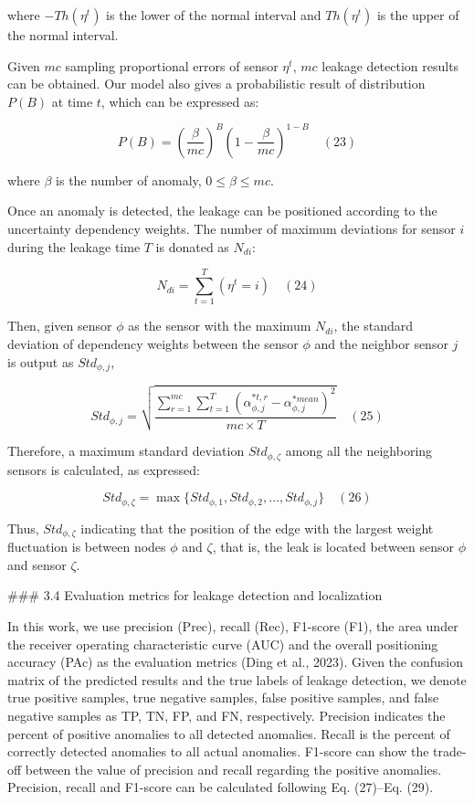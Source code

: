 where $-Th(\eta^t)$ is the lower of the normal interval and $Th(\eta^t)$ is the upper of the normal interval.

Given $mc$ sampling proportional errors of sensor $\eta^t$, $mc$ leakage detection results can be obtained. Our model also gives a probabilistic result of distribution $P(B)$ at time $t$, which can be expressed as:

$$
P(B) = \left(\frac{\beta}{mc}\right)^B \left(1 - \frac{\beta}{mc}\right)^{1-B} \quad (23)
$$

where $\beta$ is the number of anomaly, $0 \leq \beta \leq mc$.

Once an anomaly is detected, the leakage can be positioned according to the uncertainty dependency weights. The number of maximum deviations for sensor $i$ during the leakage time $T$ is donated as $N_{di}$:

$$
N_{di} = \sum_{t=1}^T (\eta^t = i) \quad (24)
$$

Then, given sensor $\phi$ as the sensor with the maximum $N_{di}$, the standard deviation of dependency weights between the sensor $\phi$ and the neighbor sensor $j$ is output as $Std_{\phi,j}$,

$$
Std_{\phi,j} = \sqrt{\frac{\sum_{r=1}^{mc}\sum_{t=1}^T (\alpha^{*t,r}_{\phi,j} - \alpha^{*mean}_{\phi,j})^2}{mc \times T}} \quad (25)
$$

Therefore, a maximum standard deviation $Std_{\phi,\zeta}$ among all the neighboring sensors is calculated, as expressed:

$$
Std_{\phi,\zeta} = \max \{Std_{\phi,1}, Std_{\phi,2}, \dots, Std_{\phi,j}\} \quad (26)
$$

Thus, $Std_{\phi,\zeta}$ indicating that the position of the edge with the largest weight fluctuation is between nodes $\phi$ and $\zeta$, that is, the leak is located between sensor $\phi$ and sensor $\zeta$.

### 3.4 Evaluation metrics for leakage detection and localization

In this work, we use precision (Prec), recall (Rec), F1-score (F1), the area under the receiver operating characteristic curve (AUC) and the overall positioning accuracy (PAc) as the evaluation metrics (Ding et al., 2023). Given the confusion matrix of the predicted results and the true labels of leakage detection, we denote true positive samples, true negative samples, false positive samples, and false negative samples as TP, TN, FP, and FN, respectively. Precision indicates the percent of positive anomalies to all detected anomalies. Recall is the percent of correctly detected anomalies to all actual anomalies. F1-score can show the trade-off between the value of precision and recall regarding the positive anomalies. Precision, recall and F1-score can be calculated following Eq. (27)–Eq. (29).

